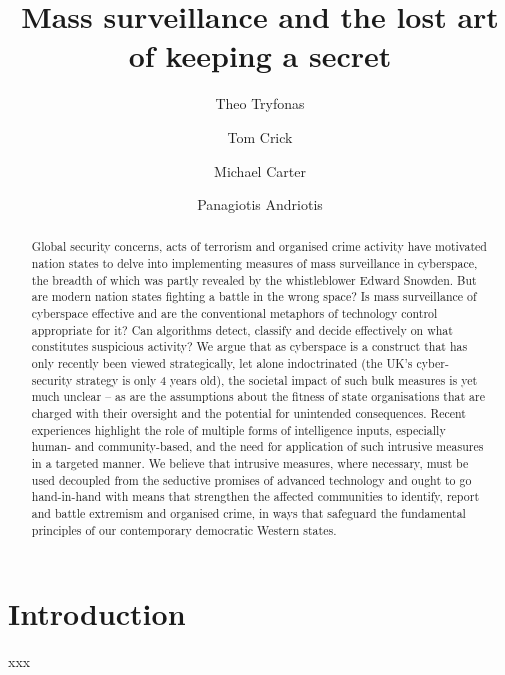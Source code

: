 \documentclass{llncs}
\begin{document}
\title{Mass surveillance and the lost art of keeping a secret}

\author{Theo Tryfonas \and Tom Crick \and Michael Carter \and Panagiotis Andriotis}

\maketitle

\begin{abstract}
Global security concerns, acts of terrorism and organised crime activity have motivated nation states to delve into implementing measures of mass surveillance in cyberspace, the breadth of which was partly revealed by the whistleblower Edward Snowden. But are modern nation states fighting a battle in the wrong space? Is mass surveillance of cyberspace effective and are the conventional metaphors of technology control appropriate for it? Can algorithms detect, classify and decide effectively on what constitutes suspicious activity? We argue that as cyberspace is a construct that has only recently been viewed strategically, let alone indoctrinated (the UK’s cyber-security strategy is only 4 years old), the societal impact of such bulk measures is yet much unclear – as are the assumptions about the fitness of state organisations that are charged with their oversight and the potential for unintended consequences. Recent experiences highlight the role of multiple forms of intelligence inputs, especially human- and community-based, and the need for application of such intrusive measures in a targeted manner. We believe that intrusive measures, where necessary, must be used decoupled from the seductive promises of advanced technology and ought to go hand-in-hand with means that strengthen the affected communities to identify, report and battle extremism and organised crime, in ways that safeguard the fundamental principles of our contemporary democratic Western states. 
\end{abstract}

\section{Introduction}
\label{sec:Introduction}
xxx
\end{document}
